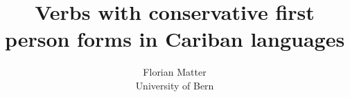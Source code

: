 \newcommand{\kaxone}{\\\small\begin{tabular}{@{}rllll@{}}
& \gl{a} & \gl{s_a_} & \gl{s_p_} & \gl{p}\\
\gl{1} & \obj{w-} & \obj{w-} & \obj{k-}, Ø/\obj{j-} & Ø/\obj{j-}\\
\gl{2} & \obj{m-} & \obj{m-} & \obj{o-} & \obj{o-}\\
\gl{1+2} & \obj{kɨt-} & \obj{kɨt-} & \obj{k-}, \obj{kɨt-} & \obj{k-}\\
\end{tabular}}

\newcommand{\pwone}{\\\small\begin{tabular}{@{}rllll@{}}
& \gl{a} & \gl{s_a_} & \gl{s_p_} & \gl{p}\\
\gl{1} & \rc{w-} & \emp{\rc{k-}} & \rc{k-} & \emp{\rc{owɨ(ro) j-}}\\
\gl{2} & \rc{m-} & \rc{m-} & \rc{o(j)-} & \rc{o(j)-}\\
\gl{1+2} & \rc{tɨt-} & \rc{tɨt-} & \rc{tɨt-} & \rc{k-}\\
\end{tabular}}

\newcommand{\hixone}{\\\small\begin{tabular}{@{}rllll@{}}
& \gl{a} & \gl{s_a_} & \gl{s_p_} & \gl{p}\\
\gl{1} & \obj{w-}/\obj{ɨ-} & \obj{k-} & \obj{k-} & \obj{r(o)-}\\
\gl{2} & \obj{m-} & \obj{m-} & \obj{o(j)-} & \obj{o(j)-}\\
\gl{1+2} & \obj{t-} & \obj{t-} & \obj{t-} & \obj{k-}\\
\end{tabular}}

\newcommand{\waione}{\\\small\begin{tabular}{@{}rllll@{}}
& \gl{a} & \gl{s_a_} & \gl{s_p_} & \gl{p}\\
\gl{1} & \obj{w-} & \obj{k-} & \obj{k-} & \obj{o(j)-}\\
\gl{2} & \obj{m-} & \obj{m-} & \emp{\obj{m-}} & \obj{a(w)-}\\
\gl{1+2} & \obj{t(ɨt)-} & \obj{t(ɨt)-} & \obj{t(ɨt)-} & \obj{k-}\\
\end{tabular}}

\title{Verbs with conservative first person forms in Cariban languages}
\author{Florian Matter \\ University of Bern}


